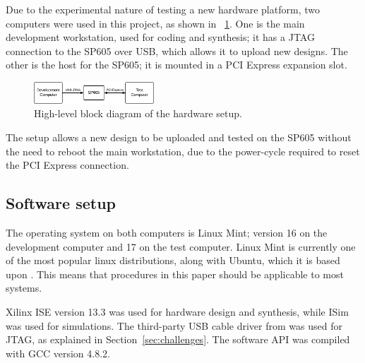 Due to the experimental nature of testing a new hardware platform, two computers were used in this project, as shown in \figurename~\ref{fig:hardware-setup}.
One is the main development workstation, used for coding and synthesis; it has a JTAG connection to the SP605 over USB, which allows it to upload new designs.
The other is the host for the SP605; it is mounted in a PCI Express expansion slot.

\begin{figure}[!ht]
    \centering
    \includegraphics[width=0.40\textwidth]{figures/hardware-setup}
    \caption{High-level block diagram of the hardware setup.}
    \label{fig:hardware-setup}
\end{figure}

The setup allows a new design to be uploaded and tested on the SP605 without the need to reboot the main workstation, due to the power-cycle required to reset the PCI Express connection.

\subsection{Software setup}

The operating system on both computers is Linux Mint; version 16 on the development computer and 17 on the test computer.
Linux Mint is currently one of the most popular linux distributions, along with Ubuntu, which it is based upon \cite{distrowatch}.
This means that procedures in this paper should be applicable to most systems.

Xilinx ISE version 13.3 was used for hardware design and synthesis, while ISim was used for simulations.
The third-party USB cable driver from \cite{usbdriver} was used for JTAG, as explained in Section~\ref{sec:challenges}.
The software API was compiled with GCC version 4.8.2.

